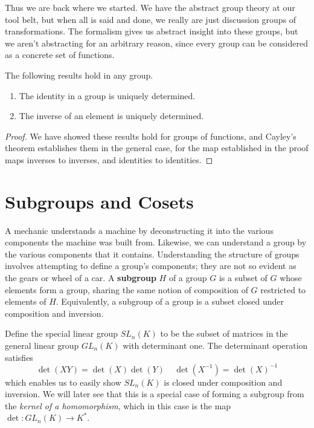 Thus we are back where we started. We have the abstract group theory at our tool belt, but when all is said and done, we really are just discussion groups of transformations. The formalism gives us abstract insight into these groups, but we aren't abstracting for an arbitrary reason, since every group can be considered as a concrete set of functions.

\begin{corollary}
    The following results hold in any group.
    \begin{enumerate}
        \item The identity in a group is uniquely determined.
        \item The inverse of an element is uniquely determined.
    \end{enumerate}
\end{corollary}
\begin{proof}
    We have showed these results hold for groups of functions, and Cayley's theorem establishes them in the general case, for the map established in the proof maps inverses to inverses, and identities to identities.
\end{proof}

\section{Subgroups and Cosets}

A mechanic understands a machine by deconstructing it into the various components the machine was built from. Likewise, we can understand a group by the various components that it contains. Understanding the structure of groups involves attempting to define a group's components; they are not so evident as the gears or wheel of a car. A {\bf subgroup} $H$ of a group $G$ is a subset of $G$ whose elements form a group, sharing the same notion of composition of $G$ restricted to elements of $H$. Equivalently, a subgroup of a group is a subset closed under composition and inversion.

\begin{example}
    Define the special linear group $SL_n(K)$ to be the subset of matrices in the general linear group $GL_n(K)$ with determinant one. The determinant operation satisfies
    \[ \det(XY) = \det(X) \det(Y)\ \ \ \ \ \det(X^{-1}) = \det(X)^{-1} \]
    which enables us to easily show $SL_n(K)$ is closed under composition and inversion. We will later see that this is a special case of forming a subgroup from the {\it kernel of a homomorphism}, which in this case is the map $\det: GL_n(K) \to K^*$.
\end{example}


